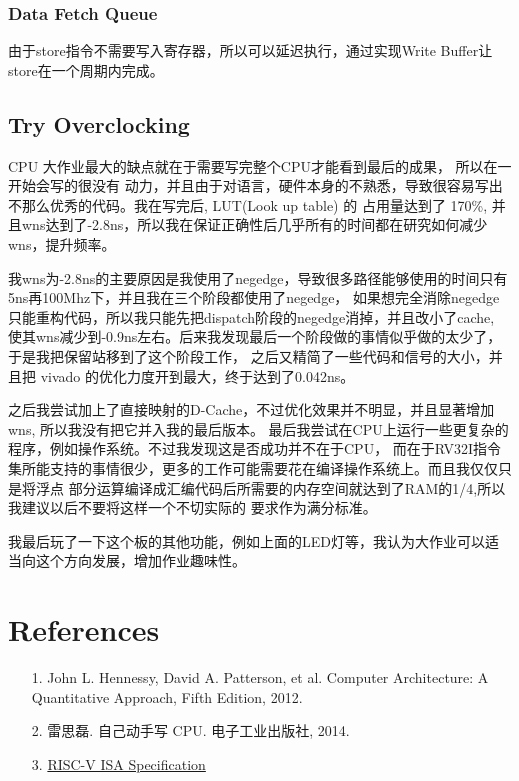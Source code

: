 \documentclass[UTF8]{ctexart}
\begin{document}
    \subsubsection{Data Fetch Queue}
    由于store指令不需要写入寄存器，所以可以延迟执行，通过实现Write Buffer让store在一个周期内完成。
    
    \subsection{Try Overclocking}
    CPU 大作业最大的缺点就在于需要写完整个CPU才能看到最后的成果， 所以在一开始会写的很没有
    动力，并且由于对语言，硬件本身的不熟悉，导致很容易写出不那么优秀的代码。我在写完后, LUT(Look up table) 的
    占用量达到了 170\%, 并且wns达到了-2.8ns，所以我在保证正确性后几乎所有的时间都在研究如何减少wns，提升频率。

    我wns为-2.8ns的主要原因是我使用了negedge，导致很多路径能够使用的时间只有5ns再100Mhz下，并且我在三个阶段都使用了negedge，
    如果想完全消除negedge只能重构代码，所以我只能先把dispatch阶段的negedge消掉，并且改小了cache,
    使其wns减少到-0.9ns左右。后来我发现最后一个阶段做的事情似乎做的太少了，于是我把保留站移到了这个阶段工作，
    之后又精简了一些代码和信号的大小，并且把 vivado 的优化力度开到最大，终于达到了0.042ns。

    之后我尝试加上了直接映射的D-Cache，不过优化效果并不明显，并且显著增加wns, 所以我没有把它并入我的最后版本。
    最后我尝试在CPU上运行一些更复杂的程序，例如操作系统。不过我发现这是否成功并不在于CPU，
    而在于RV32I指令集所能支持的事情很少，更多的工作可能需要花在编译操作系统上。而且我仅仅只是将浮点
    部分运算编译成汇编代码后所需要的内存空间就达到了RAM的1/4,所以我建议以后不要将这样一个不切实际的
    要求作为满分标准。

    我最后玩了一下这个板的其他功能，例如上面的LED灯等，我认为大作业可以适当向这个方向发展，增加作业趣味性。

\section{References}
    \begin{itemize}
        \item [1.] 
        John L. Hennessy, David A. Patterson, et al. Computer Architecture: A Quantitative Approach, Fifth Edition, 2012.
        \item [2.]
        雷思磊. 自己动手写 CPU. 电子工业出版社, 2014.
        \item [3.]
        \href{http://riscv.org/specifications/}{RISC-V ISA Specification}
    \end{itemize}

\newpage
\end{document}
